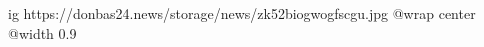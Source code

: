  
 
 
 
 

\ifcmt
  ig https://donbas24.news/storage/news/zk52biogwogfscgu.jpg
  @wrap center
  @width 0.9
\fi
